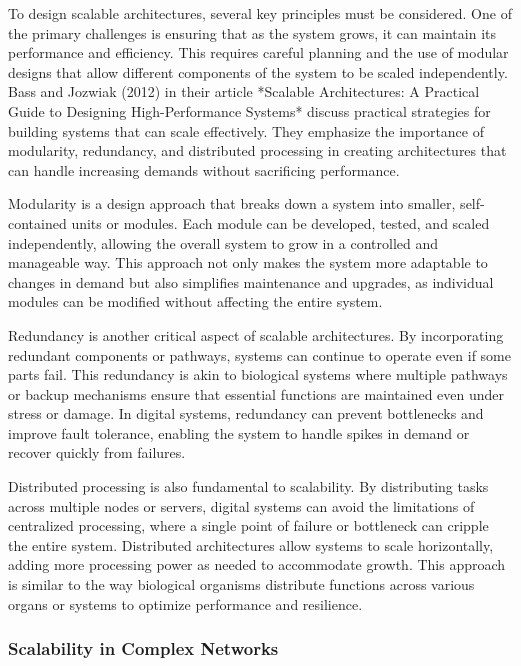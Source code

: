 \documentclass[12pt,twoside]{article}
\begin{document}
To design scalable architectures, several key principles must be considered. One of the primary challenges is ensuring that as the system grows, it can maintain its performance and efficiency. This requires careful planning and the use of modular designs that allow different components of the system to be scaled independently. Bass and Jozwiak (2012) in their article *Scalable Architectures: A Practical Guide to Designing High-Performance Systems* discuss practical strategies for building systems that can scale effectively. They emphasize the importance of modularity, redundancy, and distributed processing in creating architectures that can handle increasing demands without sacrificing performance.

Modularity is a design approach that breaks down a system into smaller, self-contained units or modules. Each module can be developed, tested, and scaled independently, allowing the overall system to grow in a controlled and manageable way. This approach not only makes the system more adaptable to changes in demand but also simplifies maintenance and upgrades, as individual modules can be modified without affecting the entire system.

Redundancy is another critical aspect of scalable architectures. By incorporating redundant components or pathways, systems can continue to operate even if some parts fail. This redundancy is akin to biological systems where multiple pathways or backup mechanisms ensure that essential functions are maintained even under stress or damage. In digital systems, redundancy can prevent bottlenecks and improve fault tolerance, enabling the system to handle spikes in demand or recover quickly from failures.

Distributed processing is also fundamental to scalability. By distributing tasks across multiple nodes or servers, digital systems can avoid the limitations of centralized processing, where a single point of failure or bottleneck can cripple the entire system. Distributed architectures allow systems to scale horizontally, adding more processing power as needed to accommodate growth. This approach is similar to the way biological organisms distribute functions across various organs or systems to optimize performance and resilience.

\subsubsection{Scalability in Complex Networks}
\end{document}
